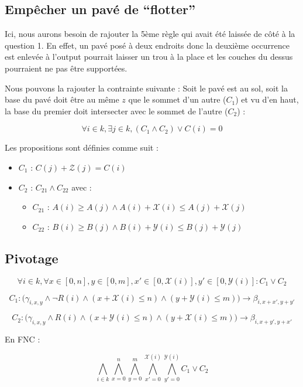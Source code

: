 \documentclass[a4paper]{article}
\begin{document}
\subsection{Empêcher un pavé de ``flotter''}

Ici, nous aurons besoin de rajouter la 5ème règle qui avait été laissée de côté à la question 1. En effet, un pavé posé à deux endroits donc la deuxième occurrence est enlevée à l'output pourrait laisser un trou à la place et les couches du dessus pourraient ne pas être supportées.

Nous pouvons la rajouter la contrainte suivante : Soit le pavé est au sol, soit la base du pavé doit être au même $z$ que le sommet d'un autre ($C_1$) et vu d'en haut, la base du premier doit intersecter avec le sommet de l'autre ($C_2$) :

$$\forall i \in k, \exists j \in k, (C_1 \land C_2) \lor C(i) = 0$$

Les propositions sont définies comme suit :
\begin{itemize}
  \item $C_1$ :
  $
  C(j) + \mathcal{Z}(j) = C(i)
  $
  \item $C_2$ : $C_{21} \land C_{22}$ avec :
  \begin{itemize}
    \item $C_{21}$ : $A(i) \geq A(j) \land A(i) + \mathcal{X}(i) \leq A(j) + \mathcal{X}(j)$
    \item $C_{22}$ : $B(i) \geq B(j) \land B(i) + \mathcal{Y}(i) \leq B(j) + \mathcal{Y}(j)$
  \end{itemize}
\end{itemize}

\subsection{Pivotage}

$$
\forall i \in k,
\forall x \in [0, n] , y \in [0, m],
x' \in [0, \mathcal{X}(i)], y' \in [0, \mathcal{Y}(i)] : C_1 \lor C_2
$$

$$
C_1 : \Big(
\gamma_{i, x, y} \land \lnot R(i)
\land (x + \mathcal{X}(i) \leq n)
\land (y + \mathcal{Y}(i) \leq m)
\Big)
\rightarrow \beta_{i, x + x', y + y'}
$$

$$
C_2 : \Big(
\gamma_{i, x, y} \land R(i)
\land (x + \mathcal{Y}(i) \leq n)
\land (y + \mathcal{X}(i) \leq m)
\Big)
\rightarrow \beta_{i, x + y', y + x'}
$$

En FNC :

$$
\bigwedge_{i \in k}
\bigwedge_{x=0}^{n} \bigwedge_{y=0}^{m}
\bigwedge_{x'=0}^{\mathcal{X}(i)} \bigwedge_{y'=0}^{\mathcal{Y}(i)} C_1 \lor C_2
$$
\end{document}
